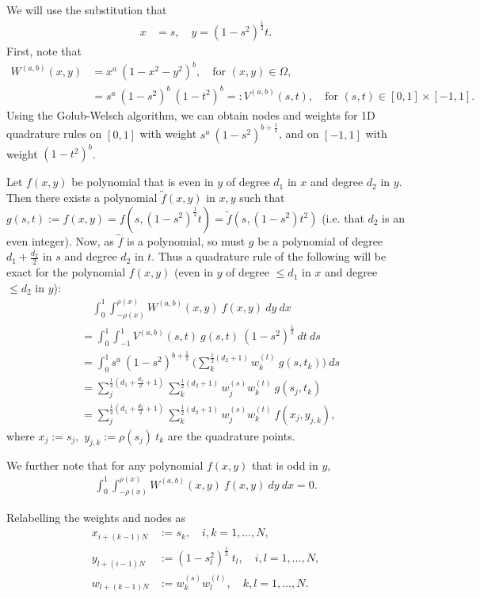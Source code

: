 \documentclass[11pt, oneside]{article}   	%
\newcommand{\half}{\frac{1}{2}}
\begin{document}
We will use the substitution that
\begin{align}
x &= s, \quad y = (1-s^2)^\half t.
\end{align}
First, note that
\begin{align}
W^{(a,b)}(x,y) &= x^a \: (1-x^2-y^2)^b, \quad \text{for } (x,y) \in \Omega, \\
		      &= s^a \: (1-s^2)^{b} \: (1-t^2)^b =: V^{(a,b)}(s,t), \quad \text{for } (s,t) \in [0,1] \times [-1,1].
\end{align}
Using the Golub-Welsch algorithm, we can obtain nodes and weights for 1D quadrature rules on \([0,1]\) with weight \(s^a \: (1-s^2)^{b+\half}\), and on \([-1,1]\) with weight \((1-t^2)^b\).

Let \(f(x,y)\) be polynomial that is even in \(y\) of degree $d_1$ in $x$ and degree $d_2$ in $y$. Then there exists a polynomial \(\tilde{f}(x,y)\) in \(x,y\) such that \(g(s,t) := f(x, y) = f(s, (1-s^2)^\half t) = \tilde{f}(s, (1-s^2) t^2)\) (i.e. that $d_2$ is an even integer). Now, as \(\tilde{f}\) is a polynomial, so must \(g\) be a polynomial of degree $d_1+\frac{d_2}{2}$ in $s$ and degree $d_2$ in $t$. Thus a quadrature rule of the following will be exact for the polynomial $f(x,y)$ (even in \(y\) of degree $\le d_1$ in $x$ and degree $\le d_2$ in $y$):
\begin{align}
& \quad \int_0^1 \int_{-\rho(x)}^{\rho(x)} W^{(a,b)}(x,y) \: f(x,y) \: dy \: dx \\
&= \int_0^1 \int_{-1}^1 V^{(a,b)}(s,t) \: g(s,t) \: (1-s^2)^\half \: dt \: ds \\
&= \int_0^1 s^a \: (1-s^2)^{b+\half} \: \Big( \sum_k^{\half(d_2 + 1)} w_k^{(t)} \: g(s, t_k) \Big) \: ds \\
&= \sum_j^{\half(d_1 + \frac{d_2}{2} + 1)} \sum_k^{\half(d_2 + 1)} w_j^{(s)} w_k^{(t)} \: g(s_j, t_k) \\
&= \sum_j^{\half(d_1 + \frac{d_2}{2} + 1)} \sum_k^{\half(d_2 + 1)} w_j^{(s)} w_k^{(t)} \: f(x_j, y_{j,k}),
\end{align}
where \(x_j := s_j,\) \(y_{j,k} := \rho(s_j) \: t_k\) are the quadrature points.

We further note that for any polynomial \(f(x,y)\) that is odd in \(y\),
\begin{align}
\int_0^1 \int_{-\rho(x)}^{\rho(x)} W^{(a,b)}(x,y) \: f(x,y) \: dy \: dx = 0.
\end{align}

Relabelling the weights and nodes as 
\begin{align}
x_{i+(k-1)N} &:= s_k, \quad i,k = 1,\dots,N, \\
y_{l+(i-1)N} &:= (1-s_l^2)^\half \: t_l, \quad i,l = 1,\dots,N, \\
w_{l+(k-1)N} &:= w_k^{(s)} w_l^{(t)}, \quad k,l = 1,\dots,N.
\end{align}
\end{document}
